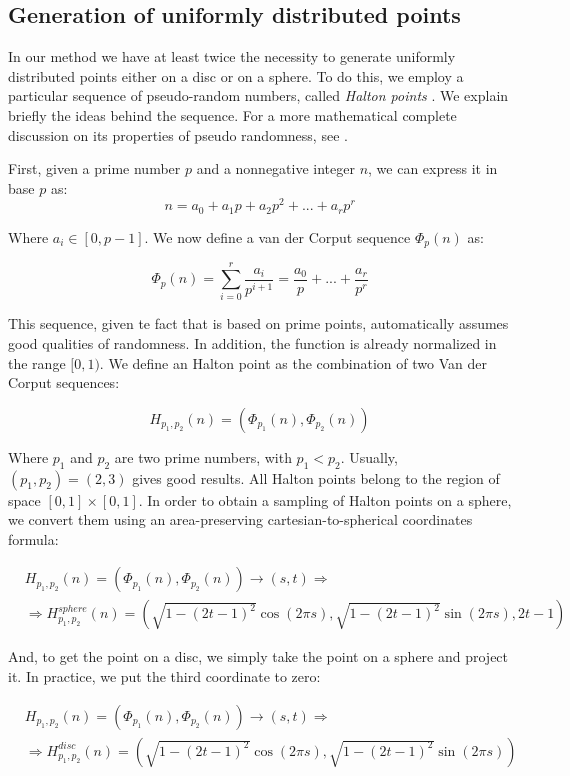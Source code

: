 \subsection{Generation of uniformly distributed points}
In our method we have at least twice the necessity to generate uniformly distributed points either on a disc or on a sphere. To do this, we employ a particular sequence of pseudo-random numbers, called \emph{Halton points} \citep{Halton:1964:ARQ:355588.365104}. We explain briefly the ideas behind the sequence. For a more mathematical complete discussion on its properties of pseudo randomness, see \cite{niederreiter1992a}. 

First, given a prime number $p$ and a nonnegative integer $n$, we can express it in base $p$ as:
$$
n = a_0 + {a_1} p + a_2 p^2 + ... + a_r p^r
$$  

Where $a_i \in [0, p - 1]$. We now define a van der Corput sequence $\Phi_p(n)$ as:

$$
\Phi_p(n) = \sum_{i = 0}^r \frac{a_i}{p^{i+1}} = \frac{a_0}{p} + ... + \frac{a_r}{p^r}
$$

This sequence, given te fact that is based on prime points, automatically assumes good qualities of randomness. In addition, the function is already normalized in the range $[0,1)$. We define an Halton point as the combination of two Van der Corput sequences:

$$
H_{p_1,p_2}(n) = (\Phi_{p_1}(n), \Phi_{p_2}(n))
$$ 

Where $p_1$ and $p_2$ are two prime numbers, with $p_1 < p_2$. Usually, $(p_1,p_2) = (2,3)$ gives good results. All Halton points belong to the region of space $[0,1]\times[0,1]$. In order to obtain a sampling of Halton points on a sphere, we convert them using an area-preserving cartesian-to-spherical coordinates formula:

\begin{equation*}
\begin{split}
&H_{p_1,p_2}(n) = (\Phi_{p_1}(n), \Phi_{p_2}(n)) \rightarrow (s,t) \Rightarrow \\
&\Rightarrow H^{sphere}_{p_1,p_2}(n) = (\sqrt{1 - (2t - 1) ^2} \cos(2\pi s),\sqrt{1 - (2t - 1) ^2} \sin(2\pi s), 2t-1) 
\end{split}
\end{equation*}

And, to get the point on a disc, we simply take the point on a sphere and project it. In practice, we put the third coordinate to zero:

\begin{equation*}
\begin{split}
&H_{p_1,p_2}(n) = (\Phi_{p_1}(n), \Phi_{p_2}(n)) \rightarrow (s,t) \Rightarrow\\
& \Rightarrow H^{disc}_{p_1,p_2}(n) = (\sqrt{1 - (2t - 1) ^2} \cos(2\pi s),\sqrt{1 - (2t - 1) ^2} \sin(2\pi s)) 
\end{split}
\end{equation*}


